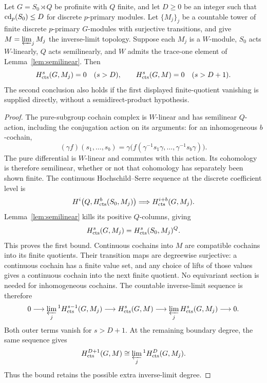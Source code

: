 \begin{lemma}\label{lem:adic}
Let $G=S_0\rtimes Q$ be profinite with $Q$ finite, and let $D\geq0$
be an integer such that $\operatorname{cd}_p(S_0)\leq D$ for discrete $p$-primary modules.
Let $\{M_j\}_j$ be a countable tower of finite discrete $p$-primary
$G$-modules with surjective transitions, and give
$M=\varprojlim_j M_j$ the inverse-limit topology. Suppose each $M_j$ is a
$W$-module, $S_0$ acts $W$-linearly, $Q$ acts semilinearly, and $W$ admits the
trace-one element of Lemma~\ref{lem:semilinear}. Then
\[
 H^s_{\operatorname{cts}}(G,M_j)=0\quad(s>D),\qquad
 H^s_{\operatorname{cts}}(G,M)=0\quad(s>D+1).
\]
The second conclusion also holds if the first displayed finite-quotient
vanishing is supplied directly, without a semidirect-product hypothesis.
\end{lemma}
\begin{proof}
The pure-subgroup cochain complex is $W$-linear and has semilinear
$Q$-action, including the conjugation action on its arguments: for an
inhomogeneous $b$-cochain,
\[
 (\gamma f)(s_1,\ldots,s_b)=
 \gamma\bigl(f(\gamma^{-1}s_1\gamma,\ldots,
                  \gamma^{-1}s_b\gamma)\bigr).
\]
The pure differential is $W$-linear and commutes with this action. Its
cohomology is therefore semilinear, whether or not that cohomology has
separately been shown finite. The continuous Hochschild--Serre sequence
at the discrete coefficient level is
\[
 H^i\bigl(Q,H^b_{\operatorname{cts}}(S_0,M_j)\bigr)
 \Longrightarrow H^{i+b}_{\operatorname{cts}}(G,M_j).
\]
Lemma~\ref{lem:semilinear} kills its positive $Q$-columns, giving
\[
 H^s_{\operatorname{cts}}(G,M_j)=H^s_{\operatorname{cts}}(S_0,M_j)^Q.
\]
This proves the first bound. Continuous cochains into $M$ are compatible
cochains into its finite quotients. Their transition maps are degreewise
surjective: a continuous cochain has a finite value set, and any choice
of lifts of those values gives a continuous cochain into the next finite
quotient. No equivariant section is needed for inhomogeneous cochains.
The countable inverse-limit sequence is therefore
\begin{equation}\label{eq:adic-milnor}
 0\longrightarrow\varprojlim_j{}^1 H^{s-1}_{\operatorname{cts}}(G,M_j)
 \longrightarrow H^s_{\operatorname{cts}}(G,M)
 \longrightarrow\varprojlim_j H^s_{\operatorname{cts}}(G,M_j)\longrightarrow0.
\end{equation}
Both outer terms vanish for $s>D+1$. At the remaining boundary degree,
the same sequence gives
\[
 H^{D+1}_{\operatorname{cts}}(G,M)
 \cong\varprojlim_j{}^1 H^D_{\operatorname{cts}}(G,M_j).
\]
Thus the bound retains the possible extra inverse-limit degree.
\end{proof}


